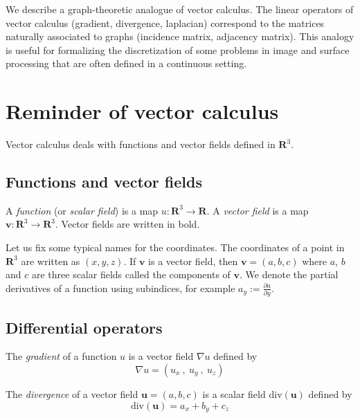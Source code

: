 \newcommand{\1}{\mathbf{1}}
\newcommand{\R}{\mathbf{R}}




We describe a graph-theoretic analogue of vector calculus.  The linear
operators of vector calculus (gradient, divergence, laplacian) correspond to
the matrices naturally associated to graphs (incidence matrix, adjacency
matrix).  This analogy is useful for formalizing the discretization of some
problems in image and surface processing that are often defined in a continuous
setting.




\section{Reminder of vector calculus}


Vector calculus deals with functions and vector fields defined in $\R^3$.



\subsection{Functions and vector fields}


A \emph{function} (or \emph{scalar field}) is a map $u:\R^3\to\R$.
A \emph{vector field} is a map $\mathbf{v}:\R^3\to\R^3$.
Vector fields are written in bold.



Let us fix some typical names for the coordinates.
The coordinates of a point in $\R^3$ are written as $(x,y,z)$.
If $\mathbf{v}$ is a vector field, then $\mathbf{v}=(a,b,c)$ where $a$, $b$
and $c$ are three scalar fields called the components of $\mathbf{v}$.
We denote the partial derivatives of a function using subindices, for
example $a_y:=\frac{\partial a}{\partial y}$.


\subsection{Differential operators}


The \emph{gradient} of a function $u$ is a vector field $\nabla u$ defined
by
\[
\nabla u = \left(
u_x\ ,\ u_y\ ,\ u_z
\right)
\]




The \emph{divergence} of a vector field $\mathbf{u}=(a,b,c)$ is a scalar
field $\mathrm{div}(\mathbf{u})$ defined by
\[
\mathrm{div}(\mathbf{u}) =
a_x + b_y + c_z
\]




